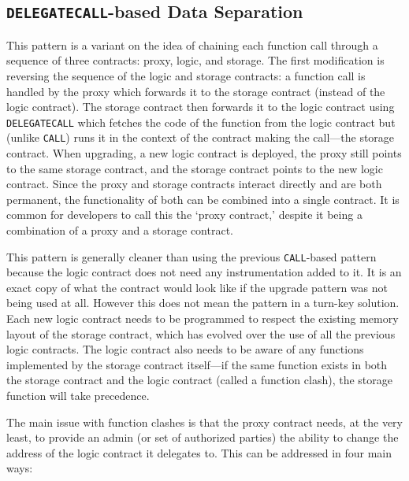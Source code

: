 
\subsection{\texttt{DELEGATECALL}-based Data Separation}
\label{sec:delegatecall}

This pattern is a variant on the idea of chaining each function call through a sequence of three contracts: proxy, logic, and storage. The first modification is reversing the sequence of the logic and storage contracts: a function call is handled by the proxy which forwards it to the storage contract (instead of the logic contract). The storage contract then forwards it to the logic contract using \texttt{DELEGATECALL} which fetches the code of the function from the logic contract but (unlike \texttt{CALL}) runs it in the context of the contract making the call---\ie the storage contract. When upgrading, a new logic contract is deployed, the proxy still points to the same storage contract, and the storage contract points to the new logic contract. Since the proxy and storage contracts interact directly and are both permanent, the functionality of both can be combined into a single contract. It is common for developers to call this the `proxy contract,' despite it being a combination of a proxy and a storage contract. 

This pattern is generally cleaner than using the previous \texttt{CALL}-based pattern because the logic contract does not need any instrumentation added to it. It is an exact copy of what the contract would look like if the upgrade pattern was not being used at all. However this does not mean the pattern in a turn-key solution. Each new logic contract needs to be programmed to respect the existing memory layout of the storage contract, which has evolved over the use of all the previous logic contracts. The logic contract also needs to be aware of any functions implemented by the storage contract itself---if the same function exists in both the storage contract and the logic contract (called a function clash), the storage function will take precedence.


The main issue with function clashes is that the proxy contract needs, at the very least, to provide an admin (or set of authorized parties) the ability to change the address of the logic contract it delegates to. This can be addressed in four main ways:

